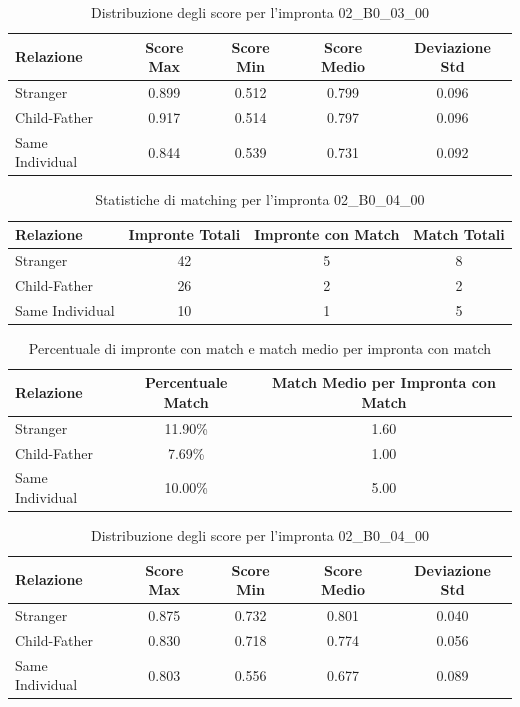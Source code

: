\begin{table}[htbp]
\centering
\caption{Distribuzione degli score per l'impronta 02\_B0\_03\_00}
\label{tab:scores_02_B0_03_00}
\begin{tabular}{|l|c|c|c|c|}
\hline
\textbf{Relazione} & \textbf{Score Max} & \textbf{Score Min} & \textbf{Score Medio} & \textbf{Deviazione Std} \\
\hline
Stranger & 0.899 & 0.512 & 0.799 & 0.096 \\
\hline
Child-Father & 0.917 & 0.514 & 0.797 & 0.096 \\
\hline
Same Individual & 0.844 & 0.539 & 0.731 & 0.092 \\
\hline
\end{tabular}
\end{table}


\begin{table}[htbp]
\centering
\caption{Statistiche di matching per l'impronta 02\_B0\_04\_00}
\label{tab:results_02_B0_04_00}
\begin{tabular}{|l|c|c|c|}
\hline
\textbf{Relazione} & \textbf{Impronte Totali} & \textbf{Impronte con Match} & \textbf{Match Totali} \\
\hline
Stranger & 42 & 5 & 8 \\
\hline
Child-Father & 26 & 2 & 2 \\
\hline
Same Individual & 10 & 1 & 5 \\
\hline
\end{tabular}
\end{table}


\begin{table}[htbp]
\centering
\caption{Percentuale di impronte con match e match medio per impronta con match}
\label{tab:match_percentage_02_B0_04_00}
\begin{tabular}{|l|c|c|}
\hline
\textbf{Relazione} & \textbf{Percentuale Match} & \textbf{Match Medio per Impronta con Match} \\
\hline
Stranger & 11.90\% & 1.60 \\
\hline
Child-Father & 7.69\% & 1.00 \\
\hline
Same Individual & 10.00\% & 5.00 \\
\hline
\end{tabular}
\end{table}


\begin{table}[htbp]
\centering
\caption{Distribuzione degli score per l'impronta 02\_B0\_04\_00}
\label{tab:scores_02_B0_04_00}
\begin{tabular}{|l|c|c|c|c|}
\hline
\textbf{Relazione} & \textbf{Score Max} & \textbf{Score Min} & \textbf{Score Medio} & \textbf{Deviazione Std} \\
\hline
Stranger & 0.875 & 0.732 & 0.801 & 0.040 \\
\hline
Child-Father & 0.830 & 0.718 & 0.774 & 0.056 \\
\hline
Same Individual & 0.803 & 0.556 & 0.677 & 0.089 \\
\hline
\end{tabular}
\end{table}



